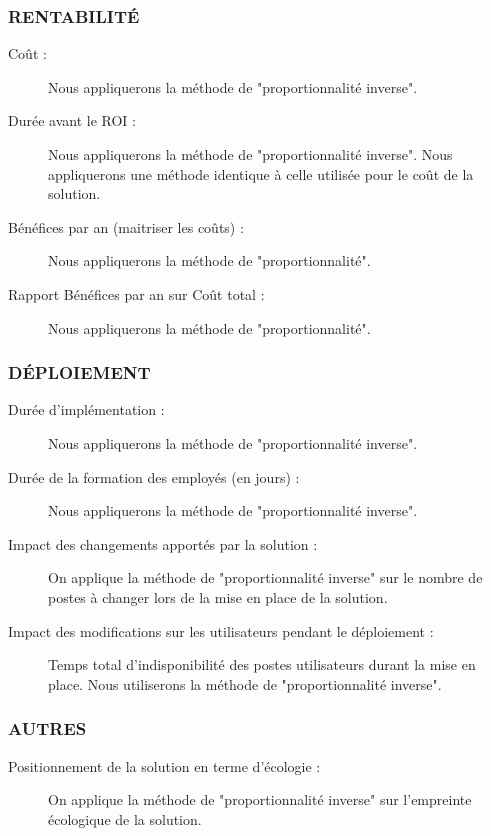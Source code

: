 \subsubsection{RENTABILITÉ}

\begin{description}
\item[Coût :] Nous appliquerons la méthode de "proportionnalité inverse".
\item[Durée avant le ROI :] Nous appliquerons la méthode de "proportionnalité inverse". Nous appliquerons une méthode identique à celle utilisée pour le coût de la solution.
\item[Bénéfices par an (maitriser les coûts) :] Nous appliquerons la méthode de "proportionnalité".
\item[Rapport Bénéfices par an sur Coût total :] Nous appliquerons la méthode de "proportionnalité".

\end{description}

\subsubsection{DÉPLOIEMENT}

\begin{description}
\item[Durée d'implémentation :] Nous appliquerons la méthode de "proportionnalité inverse".
\item[Durée de la formation des employés (en jours) :] Nous appliquerons la méthode de "proportionnalité inverse".
\item[Impact des changements apportés par la solution :] On applique la méthode de "proportionnalité inverse" sur le nombre de postes à changer lors de la mise en place de la solution.
\item[Impact des modifications sur les utilisateurs pendant le déploiement :] Temps total d'indisponibilité des postes utilisateurs durant la mise en place. Nous utiliserons la méthode de "proportionnalité inverse".

\end{description}

\subsubsection{AUTRES}
\begin{description}
\item[Positionnement de la solution en terme d'écologie :] On applique la méthode de "proportionnalité inverse" sur l'empreinte écologique de la solution.

\end{description}

